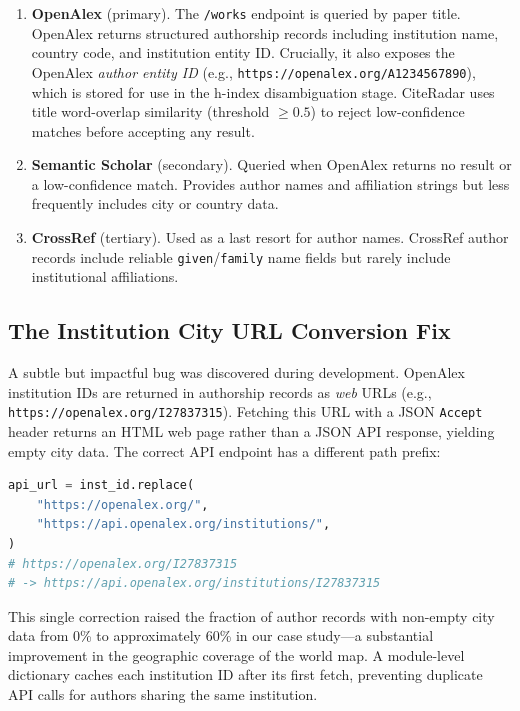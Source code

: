 \documentclass[11pt]{article}
\begin{document}
\begin{enumerate}[label=\arabic*., leftmargin=*]
\item \textbf{OpenAlex} (primary).
  The \texttt{/works} endpoint is queried by paper title.
  OpenAlex returns structured authorship records including institution name,
  country code, and institution entity ID.
  Crucially, it also exposes the OpenAlex \emph{author entity ID}
  (e.g., \texttt{https://openalex.org/A1234567890}), which is stored for
  use in the h-index disambiguation stage.
  CiteRadar uses title word-overlap similarity (threshold $\geq 0.5$) to
  reject low-confidence matches before accepting any result.

\item \textbf{Semantic Scholar} (secondary).
  Queried when OpenAlex returns no result or a low-confidence match.
  Provides author names and affiliation strings but less frequently includes
  city or country data.

\item \textbf{CrossRef} (tertiary).
  Used as a last resort for author names.
  CrossRef author records include reliable \texttt{given}/\texttt{family}
  name fields but rarely include institutional affiliations.
\end{enumerate}

\subsection{The Institution City URL Conversion Fix}

A subtle but impactful bug was discovered during development.
OpenAlex institution IDs are returned in authorship records as \emph{web}
URLs (e.g., \texttt{https://openalex.org/I27837315}).
Fetching this URL with a JSON \texttt{Accept} header returns an HTML web
page rather than a JSON API response, yielding empty city data.
The correct API endpoint has a different path prefix:

\begin{lstlisting}[language=Python]
api_url = inst_id.replace(
    "https://openalex.org/",
    "https://api.openalex.org/institutions/",
)
# https://openalex.org/I27837315
# -> https://api.openalex.org/institutions/I27837315
\end{lstlisting}

This single correction raised the fraction of author records with non-empty
city data from 0\% to approximately 60\% in our case study—a substantial
improvement in the geographic coverage of the world map.
A module-level dictionary caches each institution ID after its first fetch,
preventing duplicate API calls for authors sharing the same institution.
\end{document}
